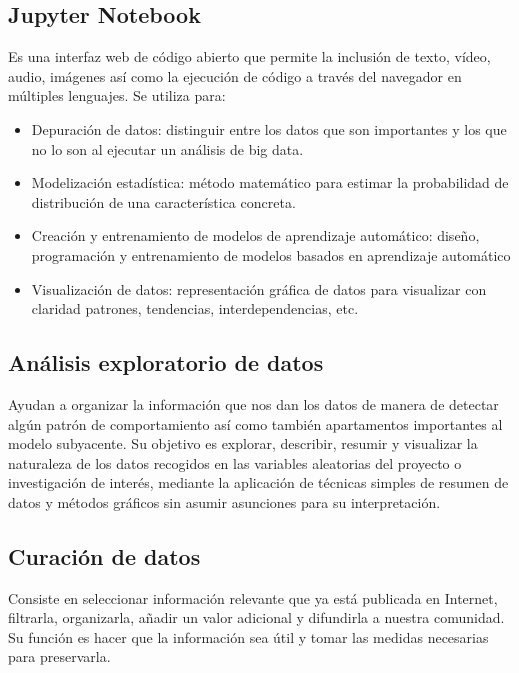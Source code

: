 \documentclass[12pt,letterpaper]{article}
\begin{document}
\subsection*{Jupyter Notebook}
Es una interfaz web de código abierto que permite la inclusión de texto, vídeo,
audio, imágenes así como la ejecución de código a través del navegador en
múltiples lenguajes. 
\citep{cabrera_diaz_jupyter}
Se utiliza para: 
\begin{itemize}
\item Depuración de datos: distinguir entre los datos que son importantes y los
que no lo son al ejecutar un análisis de big data.
\item Modelización estadística: método matemático para estimar la probabilidad
de distribución de una característica concreta.
\item Creación y entrenamiento de modelos de aprendizaje automático: diseño,
programación y entrenamiento de modelos basados en aprendizaje automático
\item Visualización de datos: representación gráfica de datos para visualizar
con claridad patrones, tendencias, interdependencias, etc.
\citep{digital_guide_ionos_jupyter}
\end{itemize}

\subsection*{Análisis exploratorio de datos}
Ayudan a organizar la información que nos dan los datos de manera de detectar
algún patrón de comportamiento así como también apartamentos importantes al
modelo subyacente.
\citep{orella_analisis_exploratorio}
Su objetivo es explorar, describir, resumir y visualizar la naturaleza de los
datos recogidos en las variables aleatorias del proyecto o investigación de
interés, mediante la aplicación de técnicas simples de resumen de datos y
métodos gráficos sin asumir asunciones para su interpretación.
\citep{heix_bios_analisis_exploratorio}

\subsection*{Curación de datos}
Consiste en seleccionar informaci\'on relevante que ya está publicada en
Internet, filtrarla, organizarla, añadir un valor adicional y difundirla a
nuestra comunidad.
\citep{duro_2017}
Su función es hacer que la información sea útil y tomar las medidas necesarias
para preservarla.
\citep{it_user_2020}
\end{document}
